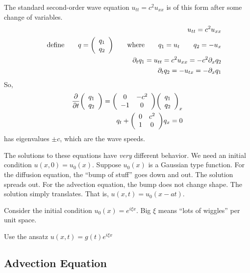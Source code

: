 \documentclass{article}
\begin{document}
        The standard second-order wave equation $u_{tt} = c^2 u_{xx}$ is of this form after some change of variables.
        \begin{align*}
            u_{tt} = c^2u_{xx} \\
            \qquad \text{define} \qquad q = \qty(\begin{array}{cc}q_1 \\ q_2\end{array}) \qquad \text{where} \qquad q_1 = u_t \qquad q_2 = -u_x \\
            \partial_tq_1 = u_{tt} = c^2u_{xx} = -c^2\partial_xq_2 \\
            \partial_tq_2 = -u_{tx} = -\partial_xq_1
        \end{align*}
        So,
        \begin{align*}
            \frac{\partial}{\partial t}\qty(\begin{array}{cc}q_1 \\ q_2\end{array}) = \qty(\begin{array}{cc}0 & -c^2 \\ -1 & 0\end{array})\qty(\begin{array}{cc}q_1 \\ q_2 \end{array})_x \\
            q_t + \qty(\begin{array}{cc}0 & c^2 \\1 & 0 \end{array})q_x = 0
        \end{align*}
        has eigenvalues $\pm c$, which are the wave speeds.

        The solutions to these equations have \emph{very} different behavior.  We need an initial condition $u(x,0) = u_0(x)$.  Suppose $u_0(x)$ is a Gaussian type function.  For the diffusion equation, the ``bump of stuff'' goes down and out.  The solution spreads out.  For the advection equation, the bump does not change shape.  The solution simply translates.  That is, $u(x,t) = u_0(x - at)$.

        Consider the initial condition $u_0(x) = e^{i\xi x}$.  Big $\xi$ means ``lots of wiggles'' per unit space.

        Use the ansatz $u(x,t) = g(t)e^{i\xi x}$

        \subsection{Advection Equation}
\end{document}

